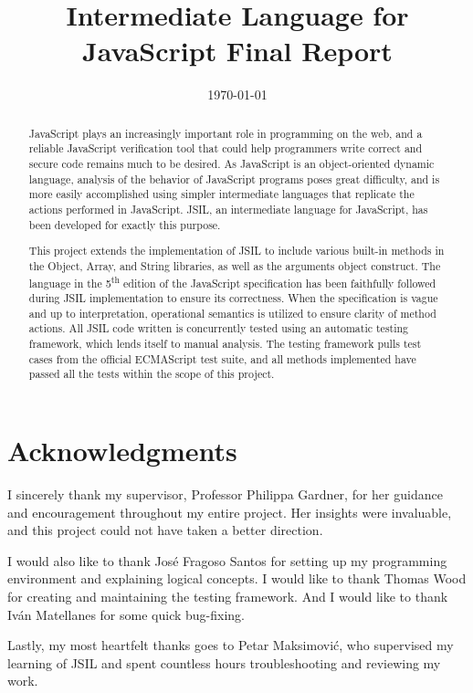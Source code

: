 \documentclass[a4paper,11pt,twoside]{report}
\title{Intermediate Language for JavaScript Final Report}
\date{\today}
\begin{document}


\clearpage{\pagestyle{empty}\cleardoublepage}
\setcounter{page}{1}
\pagestyle{fancy}

\begin{abstract}
JavaScript plays an increasingly important role in programming on the web, and a reliable JavaScript verification tool that could help programmers write correct and secure code remains much to be desired. As JavaScript is an object-oriented dynamic language, analysis of the behavior of JavaScript programs poses great difficulty, and is more easily accomplished using simpler intermediate languages that replicate the actions performed in JavaScript. JSIL, an intermediate language for JavaScript, has been developed for exactly this purpose.

This project extends the implementation of JSIL to include various built-in methods in the Object, Array, and String libraries, as well as the arguments object construct. The language in the 5\textsuperscript{th} edition of the JavaScript specification has been faithfully followed during JSIL implementation to ensure its correctness. When the specification is vague and up to interpretation, operational semantics is utilized to ensure clarity of method actions. All JSIL code written is concurrently tested using an automatic testing framework, which lends itself to manual analysis. The testing framework pulls test cases from the official ECMAScript test suite, and all methods implemented have passed all the tests within the scope of this project.
\end{abstract}

\cleardoublepage
\section*{Acknowledgments}
I sincerely thank my supervisor, Professor Philippa Gardner, for her guidance and encouragement throughout my entire project. Her insights were invaluable, and this project could not have taken a better direction.

I would also like to thank Jos\'e Fragoso Santos for setting up my programming environment and explaining logical concepts. I would like to thank Thomas Wood for creating and maintaining the testing framework. And I would like to thank Iv\'an Matellanes for some quick bug-fixing.

Lastly, my most heartfelt thanks goes to Petar Maksimovi\'c, who supervised my learning of JSIL and spent countless hours troubleshooting and reviewing my work. 
\end{document}
